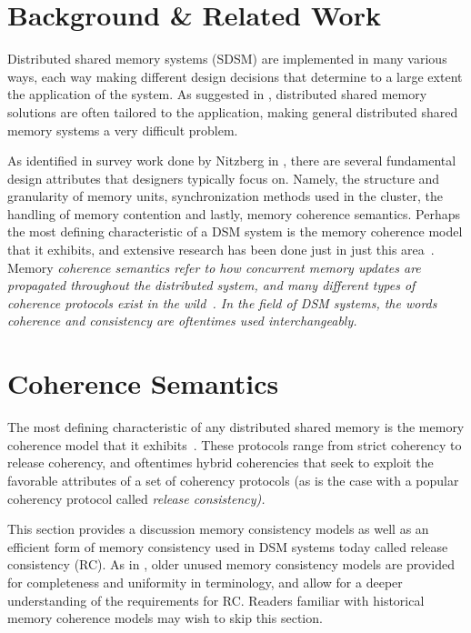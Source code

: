 \section{Background \& Related Work}

Distributed shared memory systems (SDSM) are implemented in many various ways, each way making different design decisions that determine to a large extent the application of the system.  As suggested in \cite{Zwaenepoel:1992:MDS:134397.135235}, distributed shared memory solutions are often tailored to the application, making general distributed shared memory systems a very difficult problem. 

As identified in survey work done by Nitzberg in \cite{Nitzberg:1991:DSM:112827.112855}, there are several fundamental design attributes that designers typically focus on.  Namely, the structure and granularity of memory units, synchronization methods used in the cluster, the handling of memory contention and lastly, memory coherence semantics.  Perhaps the most defining characteristic of a DSM system is the memory coherence model that it exhibits, and extensive research has been done just in just this area~\cite{Steinke:2004:UTS:1017460.1017464}.  Memory \em coherence semantics \em refer to how concurrent memory updates are propagated throughout the distributed system, and many different types of coherence protocols exist in the wild~\cite{Nitzberg:1991:DSM:112827.112855}.  In the field of DSM systems, the words \em coherence \em and \em consistency \em are oftentimes used interchangeably.


\section{Coherence Semantics}

The most defining characteristic of any distributed shared memory is the memory coherence model that it exhibits~\cite{Steinke:2004:UTS:1017460.1017464}.  These protocols range from strict coherency to release coherency, and oftentimes hybrid coherencies that seek to exploit the favorable attributes of a set of coherency protocols (as is the case with a popular coherency protocol called \em release consistency\em).  

This section provides a discussion memory consistency models as well as an efficient form of memory consistency used in DSM systems today called release consistency (RC).  As in \cite{Gharachorloo:1990:MCE:325164.325102}, older unused memory consistency models are provided for completeness and uniformity in terminology, and allow for a deeper understanding of the requirements for RC.  Readers familiar with historical memory coherence models may wish to skip this section.

